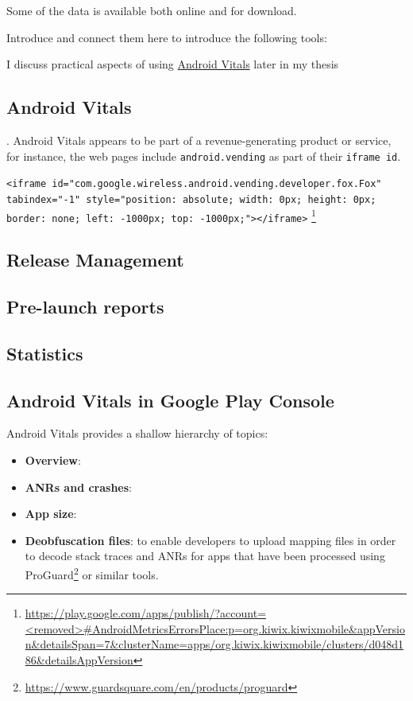 Some of the data is available both online and for download.

Introduce and connect them here to introduce the following tools:


I discuss practical aspects of using \hyperlink{android_vitals}{Android Vitals} later in my thesis

\hypertarget{android_vitals}{\subsection{Android Vitals}}.
Android Vitals appears to be part of a revenue-generating product or service, for instance, the web pages include \texttt{android.vending} as part of their \texttt{iframe id}. 

\texttt{<iframe id="com.google.wireless.android.vending.developer.fox.Fox" tabindex="-1" style="position: absolute; width: 0px; height: 0px; border: none; left: -1000px; top: -1000px;"></iframe>} \footnote{\url{https://play.google.com/apps/publish/?account=<removed>\#AndroidMetricsErrorsPlace:p=org.kiwix.kiwixmobile&appVersion&detailsSpan=7&clusterName=apps/org.kiwix.kiwixmobile/clusters/d048d186&detailsAppVersion}}

\subsection{Release Management}

\subsection{Pre-launch reports}

\subsection{Statistics}
\subsection{Android Vitals in Google Play Console}
Android Vitals provides a shallow hierarchy of topics: 
\begin{itemize}
    \item \textbf{Overview}:
    \item \textbf{ANRs and crashes}:
    \item \textbf{App size}:
    \item \textbf{Deobfuscation files}: to enable developers to upload mapping files in order to decode stack traces and ANRs for apps that have been processed using ProGuard\footnote{\url{https://www.guardsquare.com/en/products/proguard}} or similar tools.
\end{itemize}

